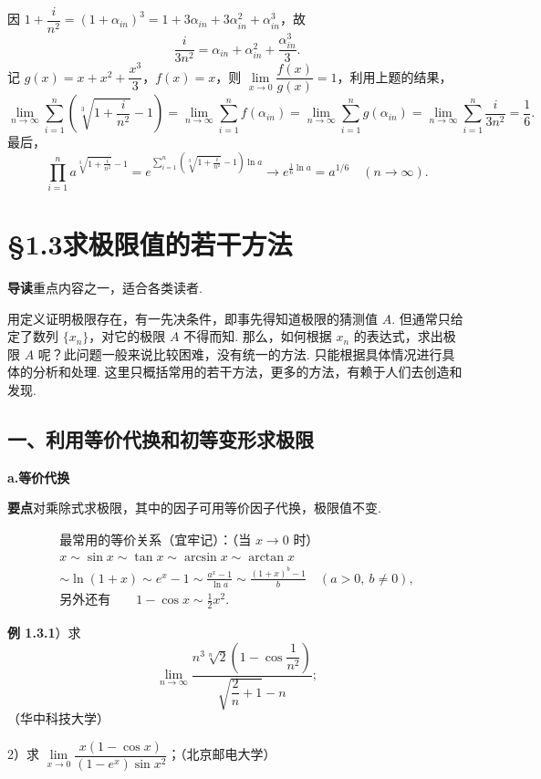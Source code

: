 \documentclass[UTF8, 12pt, fontset=fandol, oneside]{ctexart}
\begin{document}
因 $1+\dfrac{i}{n^2}=(1+\alpha_{in})^3=1+3\alpha_{in}+3\alpha_{in}^2+\alpha_{in}^3$，故
\[
  \frac{i}{3n^2}=\alpha_{in}+\alpha_{in}^2+\frac{\alpha_{in}^3}{3}.
\]
记 $g(x)=x+x^2+\dfrac{x^3}{3}$，$f(x)=x$，则 $\lim\limits_{x\to0}\dfrac{f(x)}{g(x)}=1$，利用上题的结果，
\[
\lim_{n\to\infty}\sum_{i=1}^n\left(\sqrt[3]{1+\frac{i}{n^2}}-1\right)
=\lim_{n\to\infty}\sum_{i=1}^n f(\alpha_{in})
=\lim_{n\to\infty}\sum_{i=1}^n g(\alpha_{in})
=\lim_{n\to\infty}\sum_{i=1}^n\frac{i}{3n^2}
=\frac16.
\]
最后，
\[
\prod_{i=1}^n a^{\sqrt[3]{1+\frac{i}{n^2}}-1}
=e^{\sum_{i=1}^n\left(\sqrt[3]{1+\frac{i}{n^2}}-1\right)\ln a}
\to e^{\frac16\ln a}=a^{1/6}\quad(n\to\infty).
\]

\section*{§1.3\quad 求极限值的若干方法}

\noindent\textbf{导读}\quad 重点内容之一，适合各类读者.

用定义证明极限存在，有一先决条件，即事先得知道极限的猜测值 $A$. 但通常只给定了数列 $\{x_n\}$，对它的极限 $A$ 不得而知. 那么，如何根据 $x_n$ 的表达式，求出极限 $A$ 呢？此问题一般来说比较困难，没有统一的方法. 只能根据具体情况进行具体的分析和处理. 这里只概括常用的若干方法，更多的方法，有赖于人们去创造和发现.

\subsection*{一、利用等价代换和初等变形求极限}

\noindent\textbf{a.\quad 等价代换}

\noindent\textbf{要点}\quad 对乘除式求极限，其中的因子可用等价因子代换，极限值不变.

\[
\boxed{
\begin{gathered}
\text{最常用的等价关系（宜牢记）：（当 }x\to0\text{ 时）}\\
x\sim\sin x\sim\tan x\sim\arcsin x\sim\arctan x\\
\sim\ln(1+x)\sim e^x-1\sim\frac{a^x-1}{\ln a}\sim\frac{(1+x)^b-1}{b}\quad(a>0,\ b\ne0),\\
\text{另外还有}\qquad 1-\cos x\sim\frac12x^2.
\end{gathered}}
\]

\noindent\textbf{例 1.3.1}）求
\[
  \lim_{n\to\infty}
  \frac{n^3\sqrt[n]{2}\left(1-\cos\dfrac1{n^2}\right)}
  {\sqrt{\dfrac{2}{n}+1}-n};
\]
（华中科技大学）

2）求 $\lim\limits_{x\to0}\dfrac{x(1-\cos x)}{(1-e^x)\sin x^2}$；（北京邮电大学）
\end{document}
